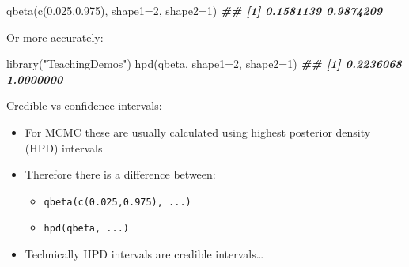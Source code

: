 \documentclass[
  ignorenonframetext,
  aspectratio=169,
]{beamer}
\newenvironment{Shaded}{\begin{snugshade}}{\end{snugshade}}
\newcommand{\AttributeTok}[1]{\textcolor[rgb]{0.77,0.63,0.00}{#1}}
\newcommand{\DecValTok}[1]{\textcolor[rgb]{0.00,0.00,0.81}{#1}}
\newcommand{\DocumentationTok}[1]{\textcolor[rgb]{0.56,0.35,0.01}{\textbf{\textit{#1}}}}
\newcommand{\FloatTok}[1]{\textcolor[rgb]{0.00,0.00,0.81}{#1}}
\newcommand{\FunctionTok}[1]{\textcolor[rgb]{0.00,0.00,0.00}{#1}}
\newcommand{\NormalTok}[1]{#1}
\newcommand{\StringTok}[1]{\textcolor[rgb]{0.31,0.60,0.02}{#1}}
\providecommand{\tightlist}{%
  \setlength{\itemsep}{0pt}\setlength{\parskip}{0pt}}
\begin{document}
\begin{frame}[fragile]
\scriptsize

\begin{Shaded}
\begin{Highlighting}[]
\FunctionTok{qbeta}\NormalTok{(}\FunctionTok{c}\NormalTok{(}\FloatTok{0.025}\NormalTok{,}\FloatTok{0.975}\NormalTok{), }\AttributeTok{shape1=}\DecValTok{2}\NormalTok{, }\AttributeTok{shape2=}\DecValTok{1}\NormalTok{)}
\DocumentationTok{\#\# [1] 0.1581139 0.9874209}
\end{Highlighting}
\end{Shaded}

\normalsize

Or more accurately:

\scriptsize

\begin{Shaded}
\begin{Highlighting}[]
\FunctionTok{library}\NormalTok{(}\StringTok{"TeachingDemos"}\NormalTok{)}
\FunctionTok{hpd}\NormalTok{(qbeta, }\AttributeTok{shape1=}\DecValTok{2}\NormalTok{, }\AttributeTok{shape2=}\DecValTok{1}\NormalTok{)}
\DocumentationTok{\#\# [1] 0.2236068 1.0000000}
\end{Highlighting}
\end{Shaded}

\normalsize

\pause

Credible vs confidence intervals:

\begin{itemize}
\tightlist
\item
  For MCMC these are usually calculated using highest posterior density
  (HPD) intervals
\item
  Therefore there is a difference between:

  \begin{itemize}
  \tightlist
  \item
    \texttt{qbeta(c(0.025,0.975),\ ...)}
  \item
    \texttt{hpd(qbeta,\ ...)}
  \end{itemize}
\item
  Technically HPD intervals are credible intervals\ldots{}
\end{itemize}
\end{frame}
\end{document}
